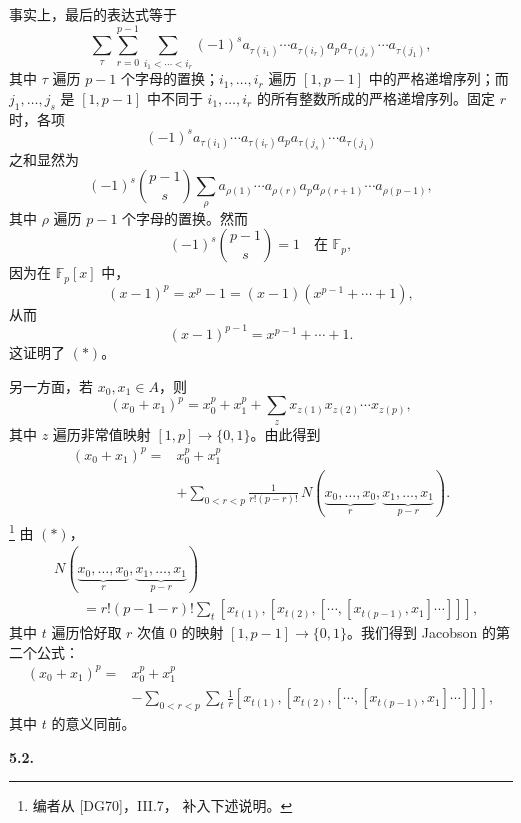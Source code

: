 事实上，最后的表达式等于
\[
  \sum_{\tau}
  \sum_{r=0}^{p-1}
  \sum_{i_1<\cdots<i_r}
  (-1)^s
  a_{\tau(i_1)}\cdots a_{\tau(i_r)}
  a_p
  a_{\tau(j_s)}\cdots a_{\tau(j_1)},
\]
其中 \(\tau\) 遍历 \(p-1\) 个字母的置换；\(i_1,\ldots,i_r\) 遍历 \([1,p-1]\) 中的严格递增序列；而 \(j_1,\ldots,j_s\) 是 \([1,p-1]\) 中不同于 \(i_1,\ldots,i_r\) 的所有整数所成的严格递增序列。固定 \(r\) 时，各项
\[
  (-1)^s
  a_{\tau(i_1)}\cdots a_{\tau(i_r)}
  a_p
  a_{\tau(j_s)}\cdots a_{\tau(j_1)}
\]
之和显然为
\[
  (-1)^s\binom{p-1}{s}
  \sum_{\rho}
  a_{\rho(1)}\cdots a_{\rho(r)}
  a_p
  a_{\rho(r+1)}\cdots a_{\rho(p-1)},
\]
其中 \(\rho\) 遍历 \(p-1\) 个字母的置换。然而
\[
  (-1)^s\binom{p-1}{s}=1
  \quad\text{在 }\mathbb F_p,
\]
因为在 \(\mathbb F_p[x]\) 中，
\[
  (x-1)^p=x^p-1=(x-1)(x^{p-1}+\cdots+1),
\]
从而
\[
  (x-1)^{p-1}=x^{p-1}+\cdots+1.
\]
这证明了 \((*)\)。

另一方面，若 \(x_0,x_1\in A\)，则
\[
  (x_0+x_1)^p
  =
  x_0^p+x_1^p+
  \sum_z x_{z(1)}x_{z(2)}\cdots x_{z(p)},
\]
其中 \(z\) 遍历非常值映射 \([1,p]\to\{0,1\}\)。由此得到
\[
\begin{aligned}
  (x_0+x_1)^p
  ={}&
  x_0^p+x_1^p \\
  &+
  \sum_{0<r<p}
  \frac{1}{r!(p-r)!}\,
  N(
    \underbrace{x_0,\ldots,x_0}_{r},
    \underbrace{x_1,\ldots,x_1}_{p-r}
  ).
\end{aligned}
\]
\footnote{编者从 \textup{[DG70]}，III.7， 补入下述说明。}
由 \((*)\)，
\[
\begin{aligned}
  &N(
    \underbrace{x_0,\ldots,x_0}_{r},
    \underbrace{x_1,\ldots,x_1}_{p-r}
  ) \\
  &\qquad =
  r!(p-1-r)!
  \sum_t
  [x_{t(1)},
    [x_{t(2)},
      [\cdots,
        [x_{t(p-1)},x_1]
      \cdots]
    ]
  ],
\end{aligned}
\]
其中 \(t\) 遍历恰好取 \(r\) 次值 \(0\) 的映射 \([1,p-1]\to\{0,1\}\)。我们得到 Jacobson 的第二个公式：
\begin{equation}
  \tag{ii}\label{sga3:vii:paragraph:5-1:equation:ii}
\begin{aligned}
  (x_0+x_1)^p
  ={}&
  x_0^p+x_1^p \\
  &-
  \sum_{0<r<p}\sum_t\frac1r
  [x_{t(1)},
    [x_{t(2)},
      [\cdots,
        [x_{t(p-1)},x_1]
      \cdots]
    ]
  ],
\end{aligned}
\end{equation}
其中 \(t\) 的意义同前。

\medskip
\noindent\textbf{5.2.}
\label{sga3:VIIA:5.2}

